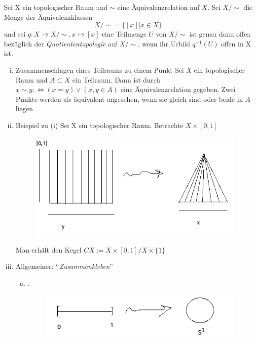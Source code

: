 \documentclass[a4paper,10pt]{scrartcl}
\renewcommand{\equiv}{\Longleftrightarrow}
\begin{document}
\begin{df}
Sei X ein topologischer Raum und $\sim$ eine Äquivalenzrelation auf $ X $.  Sei $X/\sim$ die Menge der Äquivalenzklassen 
\[
X/\sim=\{[x]|x\in X\}
\]
und sei $ q: X\to X/\sim, x\mapsto [x] $ eine Teilmenge $ U $ von $ X/\sim $ ist genau dann offen bezüglich der \emph{Quotiententopologie} auf $ X/\sim $, wenn ihr Urbild $ q^{-1}(U) $ offen in X ist.
\end{df}

\begin{ex*}
\begin{enumerate}[(i)]
\item \begin{seg}{Zusammenschlagen eines Teilraums zu einem Punkt}
Sei $ X $ ein topologischer Raum und $ A\subset X $ ein Teilraum. Dann ist durch $ x \sim y :\equiv (x=y)\lor (x,y\in A) $ eine Äquivalenzrelation gegeben.  Zwei Punkte werden als äquivalent angesehen, wenn sie gleich sind oder beide in $ A $ liegen.
\end{seg}
\item \begin{seg}{Beispiel zu (i)}
Sei X ein topologischer Raum. Betrachte $ X\times [0,1] $
\begin{figure}[H]
\centering
 \includegraphics[scale=0.6]{fig9.png}
\caption{}
\end{figure}
Man erhält den Kegel $CX:=X\times[0,1]/X\times\{1\}$
\end{seg}
\item Allgemeiner: "`\emph{Zusammenkleben}"'
\begin{enumerate}[(a)]
\item .
\begin{figure}[H]
\centering
 \includegraphics[scale=0.6]{fig10.png}

\end{figure}
\end{enumerate}
\end{enumerate}
\end{ex*}
\end{document}
